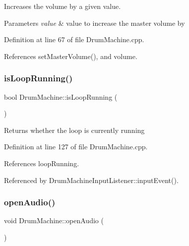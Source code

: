 Increases the volume by a given value. 
\begin{DoxyParams}{Parameters}
{\em value} & value to increase the master volume by \\
\hline
\end{DoxyParams}


Definition at line 67 of file Drum\+Machine.\+cpp.



References set\+Master\+Volume(), and volume.

\mbox{\label{class_drum_machine_aaa0c2e00a5009b239aac709c37602c7d}} 
\subsubsection{\texorpdfstring{is\+Loop\+Running()}{isLoopRunning()}}
{\footnotesize\ttfamily bool Drum\+Machine\+::is\+Loop\+Running (\begin{DoxyParamCaption}{ }\end{DoxyParamCaption})}

\begin{DoxyReturn}{Returns}
whether the loop is currently running 
\end{DoxyReturn}


Definition at line 127 of file Drum\+Machine.\+cpp.



References loop\+Running.



Referenced by Drum\+Machine\+Input\+Listener\+::input\+Event().

\mbox{\label{class_drum_machine_afd65a07ff84b6c7854ddd9ee3a529382}} 
\subsubsection{\texorpdfstring{open\+Audio()}{openAudio()}}
{\footnotesize\ttfamily void Drum\+Machine\+::open\+Audio (\begin{DoxyParamCaption}{ }\end{DoxyParamCaption})\hspace{0.3cm}{\ttfamily [private]}}



